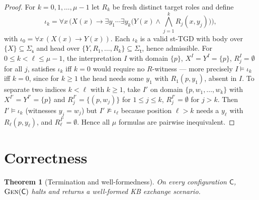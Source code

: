 \documentclass{amsart}
\newtheorem{theorem}{Theorem}
\theoremstyle{definition}
\newcommand{\Sig}{\Sigma}
\newcommand{\src}{\mathsf{s}}
\newcommand{\trg}{\mathsf{t}}
\newcommand{\Cfg}{\mathsf{C}}
\begin{document}
\begin{proof}
For $k=0,1,\dots,\mu-1$ let $R_k$ be fresh distinct target roles and define
\[
\iota_k=\forall x\,\Big(X(x)\to\exists y_1\cdots\exists y_k\big(Y(x)\wedge
\textstyle\bigwedge_{j=1}^{k}R_j(x,y_j)\big)\Big),
\]
with $\iota_0=\forall x\,(X(x)\to Y(x))$. Each $\iota_k$ is a valid st-TGD with
body over $\{X\}\subseteq\Sig_\src$ and head over
$\{Y,R_1,\dots,R_k\}\subseteq\Sig_\trg$, hence admissible. For $0\le k<\ell\le
\mu-1$, the interpretation $I$ with domain $\{p\}$, $X^I=Y^I=\{p\}$,
$R_j^I=\emptyset$ for all $j$, satisfies $\iota_k$ iff $k=0$ would require no
$R$-witness — more precisely $I\models\iota_k$ iff $k=0$, since for $k\ge1$ the
head needs some $y_1$ with $R_1(p,y_1)$, absent in $I$. To separate two indices
$k<\ell$ with $k\ge 1$, take $I'$ on domain $\{p,w_1,\dots,w_k\}$ with
$X^{I'}=Y^{I'}=\{p\}$ and $R_j^{I'}=\{(p,w_j)\}$ for $1\le j\le k$,
$R_j^{I'}=\emptyset$ for $j>k$. Then $I'\models\iota_k$ (witnesses
$y_j=w_j$) but $I'\not\models\iota_\ell$ because position $\ell>k$ needs a
$y_\ell$ with $R_\ell(p,y_\ell)$, and $R_\ell^{I'}=\emptyset$. Hence all $\mu$
formulas are pairwise inequivalent.
\end{proof}

\section{Correctness}\label{sec:correctness}

\begin{theorem}[Termination and well-formedness]\label{thm:wellformed}
On every configuration $\Cfg$, $\textsc{Gen}(\Cfg)$ halts and returns a
well-formed KB exchange scenario.
\end{theorem}
\end{document}
